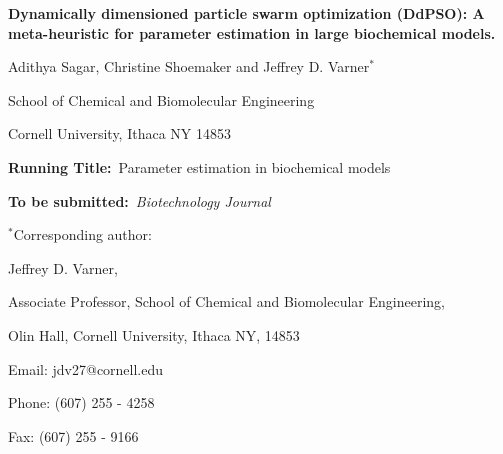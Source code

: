 \documentclass[12pt]{article}
\begin{document}
\begin{titlepage}
{\par\centering\textbf{\Large {Dynamically dimensioned particle swarm optimization (DdPSO): A meta-heuristic for parameter estimation in large biochemical models.}}}
\vspace{0.05in}
{\par \centering \large{Adithya Sagar, Christine Shoemaker and Jeffrey D. Varner$^{*}$}}
\vspace{0.10in}
{\par \centering \large{School of Chemical and Biomolecular Engineering}}
{\par \centering \large{Cornell University, Ithaca NY 14853}}
\vspace{0.1in}
{\par \centering \textbf{Running Title:}~Parameter estimation in biochemical models}
\vspace{0.1in}
{\par \centering \textbf{To be submitted:}~\emph{Biotechnology Journal}}
\vspace{0.5in}
{\par \centering $^{*}$Corresponding author:}
{\par \centering Jeffrey D. Varner,}
{\par \centering Associate Professor, School of Chemical and Biomolecular Engineering,}
{\par {} Olin Hall, Cornell University, Ithaca NY, 14853}
{\par \centering Email: jdv27@cornell.edu}
{\par \centering Phone: (607) 255 - 4258}
{\par \centering Fax: (607) 255 - 9166}
\end{titlepage}
\date{}
\thispagestyle{empty}
\pagebreak
\end{document}
